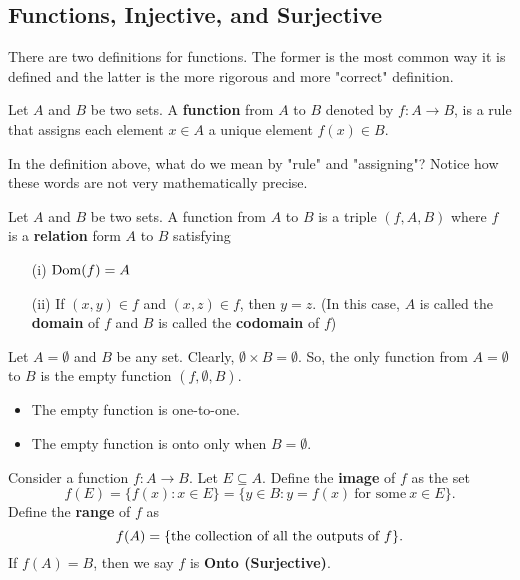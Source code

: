 \documentclass[a4paper]{report}
\begin{document}
\subsection{Functions, Injective, and Surjective}

There are two definitions for functions. The former is the most common way it is defined and the latter is the more rigorous and more "correct" definition. 

\begin{definition}
   Let \( A  \) and \( B  \) be two sets. A \textbf{function} from \( A  \) to \( B  \) denoted by \( f: A \to B  \), is a rule that assigns each element \( x \in A  \) a unique element \( f(x) \in B  \).  
\end{definition}

In the definition above, what do we mean by "rule" and "assigning"? Notice how these words are not very mathematically precise. 

\begin{definition}
    Let \( A  \) and \( B  \) be two sets. A function from \( A  \) to \( B  \) is a triple \( (f,A,B) \) where \( f \) is a \textbf{relation} form \( A  \) to \( B  \) satisfying 
    \begin{enumerate}
        \item[(i)] \( \operatorname{Dom}(f) = A   \) 
        \item[(ii)] If \( (x,y) \in f  \) and \( (x,z) \in f  \), then \( y = z  \). (In this case, \( A  \) is called the \textbf{domain} of \( f  \) and \( B  \) is called the \textbf{codomain} of \( f  \))
    \end{enumerate}
\end{definition}

\begin{eg}
    Let \( A = \emptyset  \) and \( B  \) be any set. Clearly, \( \emptyset \times B = \emptyset \). So, the only function from \( A = \emptyset  \) to \( B  \) is the empty function \( (f, \emptyset, B) \).
\end{eg}

\begin{itemize}
    \item The empty function is one-to-one.
    \item The empty function is onto only when \( B = \emptyset  \).
\end{itemize}

\begin{definition}
   Consider a function \( f: A \to B  \). Let \( E \subseteq A  \). Define the \textbf{image} of \( f  \) as the set    
   \[  f(E) = \{ f(x) : x \in  E \}  = \{ y \in B : y = f(x) \ \text{for some} \ x \in E  \}. \]
   Define the \textbf{range} of \( f  \) as 
   \[  f(A) = \{ \text{the collection of all the outputs of \( f \)} \}. \]
   If \( f(A) = B  \), then we say \( f \) is \textbf{Onto (Surjective)}.
\end{definition}
\end{document}
